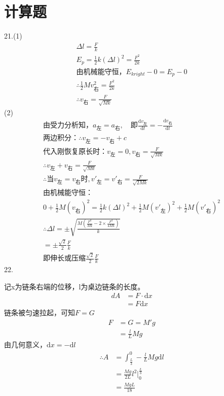 \documentclass[b5paper,opensource]{./template/qyxf-book}
\newcommand{\di}[1]{\mathrm{d}#1}
\newcommand{\dy}[2]{\frac{\di{#1}}{\di{#2}}}
\begin{document}
\section{计算题}
21.(1)
\begin{gather*}
\Delta l=\frac{F}{k}\\
E_p=\frac{1}{2}k(\Delta l)^2=\frac{F^2}{2k}\\
\text{由机械能守恒，}E_{kright}-0=E_p-0\\
\therefore\frac{1}{2}Mv_{\text{右}}^2=\frac{F^2}{2k}\\
\therefore v_{\text{右}}=\frac{F}{\sqrt{Mk}}
\end{gather*}
(2)
\begin{gather*}
\text{由受力分析知，}a_{\text{左}}=a_{\text{右}},\quad\text{即}\dy{v_{\text{左}}}{t}=-\dy{v_{\text{右}}}{t}\\
\text{两边积分：}\therefore v_{\text{左}}=-v_{\text{右}}+c\\
\text{代入刚恢复原长时：}v_{\text{左}}=0,v_{\text{右}}=\frac{F}{\sqrt{Mk}}\\
\therefore v_{\text{左}}+v_{\text{右}}=\frac{F}{\sqrt{Mk}}\\
\therefore\text{当}v_{\text{左}}=v_{\text{右}}\text{时},v'_{\text{左}}=v'_{\text{右}}=\frac{F}{\sqrt{2Mk}}\\
\text{由机械能守恒：}\\
0+\frac{1}{2}M(v_{\text{右}})^2=\frac{1}{2}k(\Delta l)^2+\frac{1}{2}M(v'_{\text{左}})^2+\frac{1}{2}M(v'_{\text{右}})^2\\
\therefore\Delta l=\pm\sqrt{\frac{M\left(\frac{F^2}{Mk}-2\times\frac{F^2}{4Mk}\right)}{k}}\\
=\pm\frac{\sqrt{2}}{2}\frac{F}{k}\\
\text{即伸长或压缩}\frac{\sqrt{2}}{2}\frac{F}{k}
\end{gather*}
22.\par 
记x为链条右端的位移，l为桌边链条的长度。
\begin{align*}
dA	&=F\cdot\di{x}\\
&=F\di{x}
\end{align*}
链条被匀速拉起，可知$F=G$
\begin{align*}
F	&=G=M'g\\
&=\frac{l}{L}Mg
\end{align*}
由几何意义，$\di{x}=-\di{l}$
\begin{align*}
\therefore A&=\int_{\frac{L}{3}}^{0} -\frac{l}{L}Mg\di{l}\\
&=\frac{Mg}{2L}l^2\left.\right|_{0}^{\frac{L}{3}}\\
&=\frac{MgL}{18}
\end{align*}
\end{document}
